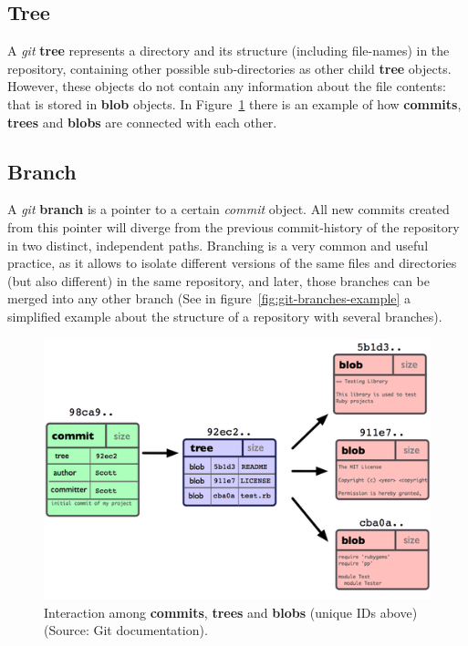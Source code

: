 \documentclass[a4paper, 12pt]{book}
\begin{document}
\subsection{Tree}
\label{ssec:git-tree}
A \emph{git} \textbf{tree} represents a directory and its structure (including file-names) in the repository, containing other possible
sub-directories as other child \textbf{tree} objects. However, these objects do not contain any information about the file contents:
that is stored in \textbf{blob} objects. In Figure~\ref{fig:git-objs-example} there is an example of how \textbf{commits},
\textbf{trees} and \textbf{blobs} are connected with each other.
\subsection{Branch}
\label{ssec:git-branch}
A \emph{git} \textbf{branch} is a pointer to a certain \emph{commit} object. All new commits
created from this pointer will diverge from the previous commit-history of the repository in two distinct, independent paths.
Branching is a very common and useful practice, as it allows to isolate different versions of the same files and directories
(but also different) in the same repository, and later, those branches can be merged into any other branch (See in
figure~\ref{fig:git-branches-example} a simplified example about the structure of a repository with several branches).
\begin{figure}
  \centering
  \includegraphics[width=12cm, keepaspectratio]{img/git-objs-example}
  \caption{Interaction among \textbf{commits}, \textbf{trees} and \textbf{blobs} (unique IDs above) (Source: Git documentation).}
  \label{fig:git-objs-example}
\end{figure}
\end{document}
